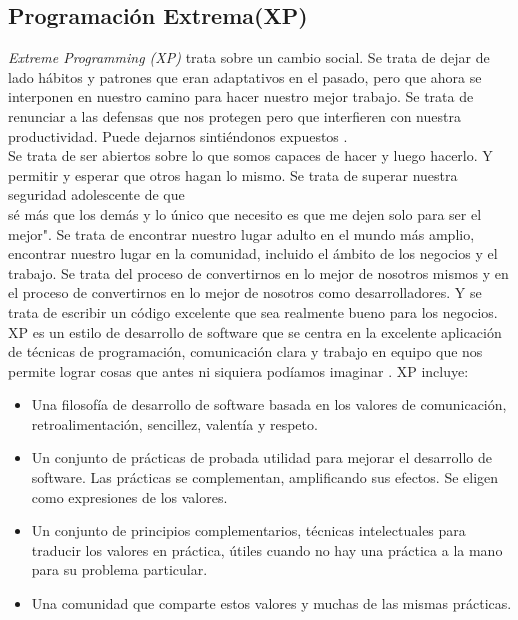 \begin{spacing}{1.5}
\section{Programaci\'{o}n Extrema(XP)}
	\textit{Extreme Programming (XP)} trata sobre un cambio social. Se trata de dejar de lado hábitos y patrones que eran adaptativos en el pasado, pero que ahora se interponen en nuestro camino para hacer nuestro mejor trabajo. Se trata de renunciar a las defensas que nos protegen pero que interfieren con nuestra productividad. Puede dejarnos sintiéndonos expuestos \cite{chap2_extreme_programming}.\\
	Se trata de ser abiertos sobre lo que somos capaces de hacer y luego hacerlo. Y permitir y esperar que otros hagan lo mismo. Se trata de superar nuestra seguridad adolescente de que \\sé m\'{a}s que los demás y lo único que necesito es que me dejen solo para ser el mejor". Se trata de encontrar nuestro lugar adulto en el mundo más amplio, encontrar nuestro lugar en la comunidad, incluido el ámbito de los negocios y el trabajo. Se trata del proceso de convertirnos en lo mejor de nosotros mismos y en el proceso de convertirnos en lo mejor de nosotros como desarrolladores. Y se trata de escribir un código excelente que sea realmente bueno para los negocios.\\
	XP es un estilo de desarrollo de software que se centra en la excelente aplicación de técnicas de programación, comunicación clara y trabajo en equipo que nos permite lograr cosas que antes ni siquiera podíamos imaginar \cite{chap2_extreme_programming}.
	XP incluye:
	\begin{itemize}
		\item Una filosofía de desarrollo de software basada en los valores de comunicación, retroalimentación, sencillez, valentía y respeto.
		\item Un conjunto de prácticas de probada utilidad para mejorar el desarrollo de software. Las prácticas se complementan, amplificando sus efectos. Se eligen como expresiones de los valores.
		\item Un conjunto de principios complementarios, técnicas intelectuales para traducir los valores en práctica, útiles cuando no hay una práctica a la mano para su problema particular.
		\item Una comunidad que comparte estos valores y muchas de las mismas prácticas.
	\end{itemize} 

\end{spacing}
